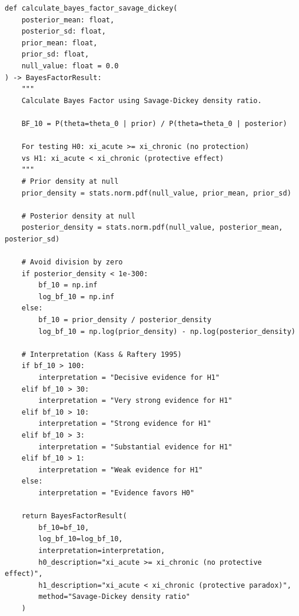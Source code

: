\documentclass[11pt]{article}
\begin{document}
\begin{lstlisting}[caption={Statistical Improvements - Bayes Factor (Lines 145--196)}]
def calculate_bayes_factor_savage_dickey(
    posterior_mean: float,
    posterior_sd: float,
    prior_mean: float,
    prior_sd: float,
    null_value: float = 0.0
) -> BayesFactorResult:
    """
    Calculate Bayes Factor using Savage-Dickey density ratio.

    BF_10 = P(theta=theta_0 | prior) / P(theta=theta_0 | posterior)

    For testing H0: xi_acute >= xi_chronic (no protection)
    vs H1: xi_acute < xi_chronic (protective effect)
    """
    # Prior density at null
    prior_density = stats.norm.pdf(null_value, prior_mean, prior_sd)

    # Posterior density at null
    posterior_density = stats.norm.pdf(null_value, posterior_mean, posterior_sd)

    # Avoid division by zero
    if posterior_density < 1e-300:
        bf_10 = np.inf
        log_bf_10 = np.inf
    else:
        bf_10 = prior_density / posterior_density
        log_bf_10 = np.log(prior_density) - np.log(posterior_density)

    # Interpretation (Kass & Raftery 1995)
    if bf_10 > 100:
        interpretation = "Decisive evidence for H1"
    elif bf_10 > 30:
        interpretation = "Very strong evidence for H1"
    elif bf_10 > 10:
        interpretation = "Strong evidence for H1"
    elif bf_10 > 3:
        interpretation = "Substantial evidence for H1"
    elif bf_10 > 1:
        interpretation = "Weak evidence for H1"
    else:
        interpretation = "Evidence favors H0"

    return BayesFactorResult(
        bf_10=bf_10,
        log_bf_10=log_bf_10,
        interpretation=interpretation,
        h0_description="xi_acute >= xi_chronic (no protective effect)",
        h1_description="xi_acute < xi_chronic (protective paradox)",
        method="Savage-Dickey density ratio"
    )
\end{lstlisting}
\end{document}
